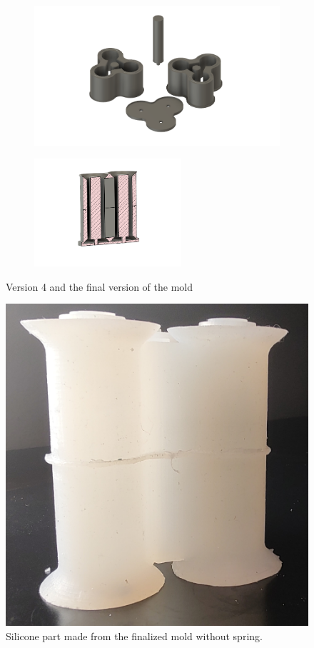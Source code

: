 \documentclass[twoside, 11pt]{article}
\begin{document}
\begin{figure} [H]
\centering
\begin{subfigure}[b]{0.4\linewidth}
		\centering
		\includegraphics[width=\textwidth]{mold_v4}
	\end{subfigure}%
	\begin{subfigure}[b]{0.5\linewidth}
		\centering		
		\includegraphics[width=0.6\textwidth]{assembled_v4}
	\end{subfigure}
\caption{Version 4 and the final version of the mold}
\end{figure}


\begin{figure} [H]
\centering
	\includegraphics[width=0.2\linewidth]{final silicon}
	\caption{Silicone part made from the finalized mold without spring.}
\end{figure}
\end{document}
